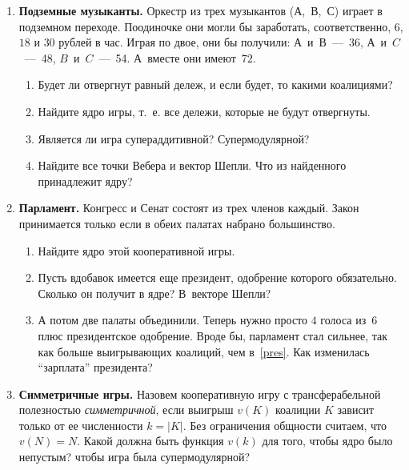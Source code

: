 \documentclass[a4paper,12pt]{article}
\begin{document}
\begin{enumerate}

\item {\bf Подземные музыканты.} Оркестр из трех музыкантов
($А$,~$В$,~$С$) играет в подземном переходе. Поодиночке они
могли бы заработать, соответственно, $6$, $18$ и $30$
рублей в час. Играя по двое, они бы получили:
$А$~и~$В$~---~36, $А$~и~$C$~---~48, $B$~и~$C$~---~54.
А~вместе они имеют~$72$.

\begin{enumerate}

\item Будет ли отвергнут равный дележ, и если будет, то
какими коалициями?

\item Найдите ядро игры, т.~е. все дележи, которые не будут
отвергнуты.

\item Является ли игра супераддитивной? Супермодулярной?

\item Найдите все точки Вебера и вектор Шепли. Что из
найденного принадлежит ядру?

\end{enumerate}

\item {\bf Парламент.} Конгресс и Сенат состоят из трех
членов каждый. Закон принимается только если в обеих
палатах набрано большинство.

\begin{enumerate}

\item Найдите ядро этой кооперативной игры.

\item\label{pres} Пусть вдобавок имеется еще президент,
одобрение которого обязательно. Сколько он получит в ядре?
В~векторе Шепли?

\item А потом две палаты объединили. Теперь нужно просто
$4$ голоса из~$6$ плюс президентское одобрение. Вроде бы,
парламент стал сильнее, так как больше выигрывающих
коалиций, чем в~\ref{pres}. Как изменилась ``зарплата''
президента?

\end{enumerate}

\item {\bf Симметричные игры.} Назовем кооперативную игру с
трансферабельной полезностью {\it симметричной}, если
выигрыш $v(K)$ коалиции $K$ зависит только от ее
численности $k=|K|$. Без ограничения общности считаем, что
$v(N)=N$. Какой должна быть функция $v(k)$ для того, чтобы
ядро было непустым? чтобы игра была супермодулярной?


\end{enumerate}
\end{document}
